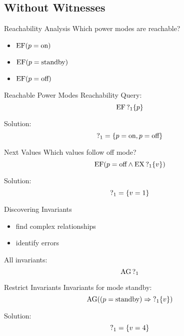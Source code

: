 \subsection{Without Witnesses}

\begin{frame}{Reachability Analysis}
  Which power modes are reachable?
  \begin{itemize}
    \item $\operatorname{EF} (p = \text{on})$
    \item $\operatorname{EF} (p = \text{standby})$
    \item $\operatorname{EF} (p = \text{off})$
  \end{itemize}
\end{frame}

\begin{frame}{Reachable Power Modes}
  Reachability Query:
  \[\operatorname{EF} \operatorname{?}_1\{p\}\]

  Solution:
  \[ \operatorname{?}_1 = \{p = \text{on}, p = \text{off}\} \]
\end{frame}

\begin{frame}{Next Values}
  Which values follow off mode?
  \[ \operatorname{EF} (p = \text{off} \land \operatorname{EX}\operatorname{?}_1\{v\}) \]

  Solution:
  \[ \operatorname{?}_1 = \{v = 1\} \]
\end{frame}

\begin{frame}{Discovering Invariants}
  \begin{itemize}
    \item find complex relationships
    \item identify errors
  \end{itemize}

  All invariants:
  \[ \operatorname{AG} \operatorname{?}_1 \]
\end{frame}

\begin{frame}{Restrict Invariants}
  Invariants for mode standby:
  \[ \operatorname{AG} ((p = \text{standby}) \Rightarrow \operatorname{?}_1\{v\}) \]

  Solution:
  \[ \operatorname{?}_1 = \{v = 4\} \]
\end{frame}

%  

